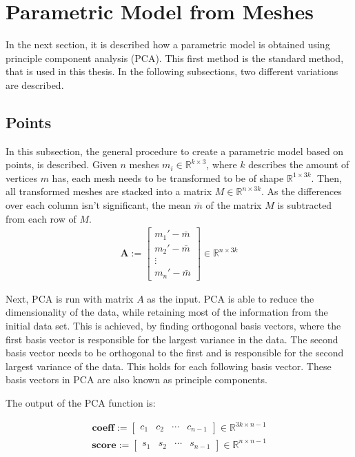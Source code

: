 \section{Parametric Model from Meshes}
In the next section, it is described how a parametric model is obtained using principle component analysis (PCA). This first method is the standard method, that is used in this thesis. In the following subsections, two different variations are described.
\subsection{Points}
\label{paramModel}
In this subsection, the general procedure to create a parametric model based on points, is described. Given $n$ meshes $m_i \in \mathbb{R}^{k \times 3}$, where $k$ describes the amount of vertices $m$ has, each mesh needs to be transformed to be of shape $\mathbb{R}^{1 \times 3k}$. Then, all transformed meshes are stacked into a matrix $M \in \mathbb{R}^{n \times 3k}$. As the differences over each column isn't significant, the mean $\bar{m}$ of the matrix $M$ is subtracted from each row of $M$.
\begin{gather}
\mathbf{A} :=
\begin{bmatrix}
 m_1' - \bar{m} \\
 m_2' - \bar{m} \\
 \vdots \\
 m_n' - \bar{m}
\end{bmatrix}
\in \mathbb{R}^{n \times 3k}
\end{gather}

Next, PCA is run with matrix $A$ as the input. PCA is able to reduce the dimensionality of the data, while retaining most of the information from the initial data set. This is achieved, by finding orthogonal basis vectors, where the first basis vector is responsible for the largest variance in the data. The second basis vector needs to be orthogonal to the first and is responsible for the second largest variance of the data. This holds for each following basis vector. These basis vectors in PCA are also known as principle components.

The output of the PCA function is:

\begin{gather}
\mathbf{coeff} :=
\begin{bmatrix}
 c_1&c_2&\cdots&c_{n-1}
\end{bmatrix}
\in \mathbb{R}^{3k \times n-1}
\end{gather}
\begin{gather}
\mathbf{score} :=
\begin{bmatrix}
s_1&s_2&\cdots&s_{n-1}
\end{bmatrix}
\in \mathbb{R}^{n \times n-1}
\end{gather}

